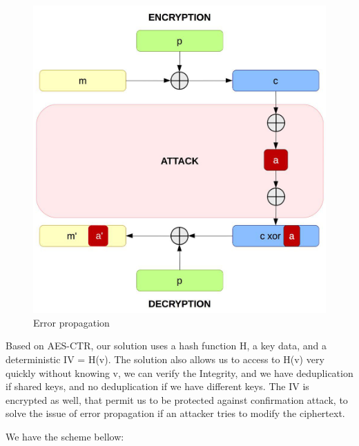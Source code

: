 \documentclass[10pt,a4paper]{report}
\begin{document}
\begin{figure}[H]
\centerline{\includegraphics[scale=0.35]{img/error-propagation.jpg}}
\caption{Error propagation}
\end{figure}

\newpage

Based on AES-CTR, our solution uses a hash function H, a key data, and a deterministic IV = H(v). The solution also allows us to access to H(v) very quickly without knowing v, we can verify the Integrity,
and we have deduplication if shared keys, and no deduplication if we have different keys.\newline
The IV is encrypted as well, that permit us to be protected against confirmation attack, to solve the issue of error propagation if an attacker tries to modify the ciphertext.\newline

We have the scheme bellow:\newline
\end{document}
